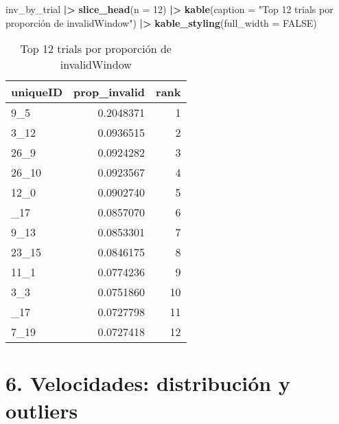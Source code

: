 \documentclass[
]{article}
\newenvironment{Shaded}{\begin{snugshade}}{\end{snugshade}}
\newcommand{\AttributeTok}[1]{\textcolor[rgb]{0.13,0.29,0.53}{#1}}
\newcommand{\ConstantTok}[1]{\textcolor[rgb]{0.56,0.35,0.01}{#1}}
\newcommand{\DecValTok}[1]{\textcolor[rgb]{0.00,0.00,0.81}{#1}}
\newcommand{\FunctionTok}[1]{\textcolor[rgb]{0.13,0.29,0.53}{\textbf{#1}}}
\newcommand{\NormalTok}[1]{#1}
\newcommand{\SpecialCharTok}[1]{\textcolor[rgb]{0.81,0.36,0.00}{\textbf{#1}}}
\newcommand{\StringTok}[1]{\textcolor[rgb]{0.31,0.60,0.02}{#1}}
\begin{document}
\begin{Shaded}
\begin{Highlighting}[]
\NormalTok{inv\_by\_trial }\SpecialCharTok{|\textgreater{}}
  \FunctionTok{slice\_head}\NormalTok{(}\AttributeTok{n =} \DecValTok{12}\NormalTok{) }\SpecialCharTok{|\textgreater{}}
  \FunctionTok{kable}\NormalTok{(}\AttributeTok{caption =} \StringTok{"Top 12 trials por proporción de invalidWindow"}\NormalTok{) }\SpecialCharTok{|\textgreater{}}
  \FunctionTok{kable\_styling}\NormalTok{(}\AttributeTok{full\_width =} \ConstantTok{FALSE}\NormalTok{)}
\end{Highlighting}
\end{Shaded}

\begin{longtable}[t]{lrr}
\caption{\label{tab:unnamed-chunk-6}Top 12 trials por proporción de invalidWindow}\\
\toprule
uniqueID & prop\_invalid & rank\\
\midrule
9\_5 & 0.2048371 & 1\\
3\_12 & 0.0936515 & 2\\
26\_9 & 0.0924282 & 3\\
26\_10 & 0.0923567 & 4\\
12\_0 & 0.0902740 & 5\\
\addlinespace
23\_17 & 0.0857070 & 6\\
9\_13 & 0.0853301 & 7\\
23\_15 & 0.0846175 & 8\\
11\_1 & 0.0774236 & 9\\
3\_3 & 0.0751860 & 10\\
\addlinespace
29\_17 & 0.0727798 & 11\\
7\_19 & 0.0727418 & 12\\
\bottomrule
\end{longtable}

\section{6. Velocidades: distribución y
outliers}\label{velocidades-distribuciuxf3n-y-outliers}
\end{document}
